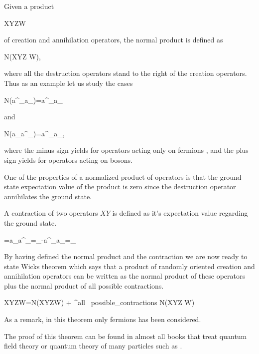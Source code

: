 Given a product 

\beq
XYZ\cdots W
\eeq

of creation and annihilation operators, the normal product is defined as 

\beq
N(XYZ \cdots W),
\eeq
 
where all the destruction operators stand to the right of the creation 
operators. Thus as an example let us study the cases

\be
N(a^\dagger_\alpha a_\beta)=a^\dagger_\alpha a_\beta
\ee

and

\be
N(a_\alpha a^\dagger_\beta)=\pm a^\dagger_\beta a_\alpha,
\ee

where the minus sign yields for operators acting only on fermions , and the plus 
sign yields for operators acting on  bosons. 

One of the properties of a normalized product of operators is that the
ground state expectation value of the product is zero since the destruction 
operator annihilates the ground state. 

A contraction of two operators $XY$ is defined as it's  expectation value 
regarding the ground state.

\be
{}=a_\alpha a^\dagger_\beta{}=\delta_{\alpha\beta}-a^\dagger_\beta a_\alpha {}=\delta_{\alpha\beta}
\label{contraction}
\ee  

By having defined the normal product and the contraction we are now ready to 
state Wicks theorem which says that a product of randomly oriented 
creation and annihilation operators can be written as the normal product of
these operators plus the normal product of all possible contractions.

\be
XYZ\cdots W=N(XYZ\cdots W) + \sum^{all \, possible}_{contractions} N(XYZ \cdots W)
\label{wicks}
\ee

As a remark, in this theorem only fermions has been considered.

The proof of this theorem can be found in almost all books that treat 
quantum field theory or quantum theory of many particles such as \cite{heinonen}.



